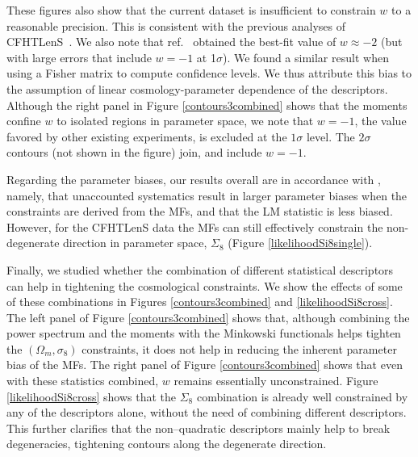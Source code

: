 \documentclass[reprint,aps,prd,superscriptaddress,showkeys,showpacs]{revtex4-1}
\begin{document}
These figures also show that the current dataset is insufficient to
constrain $w$ to a reasonable precision.
This is consistent with the previous analyses of
CFHTLenS~\citep{CFHTKilbinger,CFHTFu,Companion,CFHTMasato}.  We also
note that ref.~\citep{CFHTMasato} obtained the best-fit value of
$w\approx -2$ (but with large errors that include $w=-1$ at
1$\sigma$).  We found a similar result when using a Fisher matrix to
compute confidence levels.  We thus attribute this bias to the
assumption of linear cosmology-parameter dependence of the
descriptors.  
%
Although the right panel in Figure
\ref{contours3combined} shows that the moments confine $w$ to isolated
regions in parameter space, we note that $w=-1$, the value favored by other existing experiments, is excluded at the $1\sigma$
level. The $2\sigma$ contours (not shown in the figure) join, and
include $w=-1$.


Regarding the parameter biases, our results overall are in accordance
with \citep{PetriSpurious}, namely, that unaccounted systematics
result in larger parameter biases when the constraints are derived
from the MFs, and that the LM statistic is less biased. However, for
the CFHTLenS data the MFs can still effectively constrain the
non-degenerate direction in parameter space, $\Sigma_8$ (Figure
\ref{likelihoodSi8single}).



Finally, we studied whether the combination of different statistical
descriptors can help in tightening the cosmological constraints. We
show the effects of some of these combinations in Figures
\ref{contours3combined} and \ref{likelihoodSi8cross}. The left panel
of Figure \ref{contours3combined} shows that, although combining the
power spectrum and the moments with the Minkowski functionals helps
tighten the $(\Omega_m,\sigma_8)$ constraints, it does not help in
reducing the inherent parameter bias of the MFs. The right panel of Figure
\ref{contours3combined} shows that even with these statistics
combined, $w$ remains essentially unconstrained. Figure
\ref{likelihoodSi8cross} shows that the $\Sigma_8$ combination is
already well constrained by any of the descriptors alone, without the
need of combining different descriptors.
This further clarifies that the non--quadratic descriptors mainly help
to break degeneracies, tightening contours along the
degenerate direction.
\end{document}
